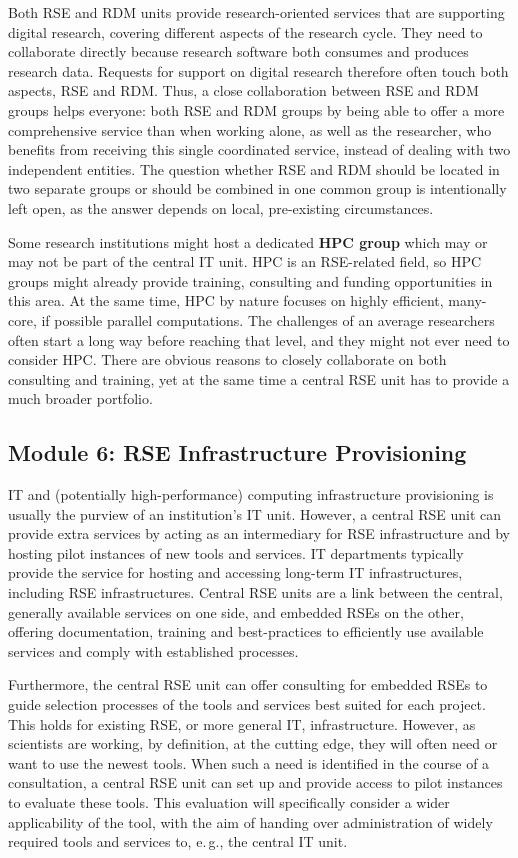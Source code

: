 \documentclass[a4paper]{article}
\makeatletter
\newcommand*{\eg}{e.\,g.\@\xspace}
\makeatother
\begin{document}
Both RSE and RDM units provide research-oriented services that are supporting digital research, covering different aspects of the research cycle.
They need to collaborate directly because research software both consumes and produces research data.
Requests for support on digital research therefore often touch both aspects, RSE and RDM\@.
Thus, a close collaboration between RSE and RDM groups helps everyone: both RSE and RDM groups by being able to offer a more comprehensive service than when working alone, as well as the researcher, who benefits from receiving this single coordinated service, instead of dealing with two independent entities.
The question whether RSE and RDM should be located in two separate groups or should be combined in one common group is intentionally left open, as the answer depends on local, pre-existing circumstances.

Some research institutions might host a dedicated \textbf{HPC group} which may or may not be part of the central IT unit.
HPC is an RSE-related field, so HPC groups might already provide training, consulting and funding opportunities in this area.
At the same time, HPC by nature focuses on highly efficient, many-core, if possible parallel computations.
The challenges of an average researchers often start a long way before reaching that level, and they might not ever need to consider HPC\@.
There are obvious reasons to closely collaborate on both consulting and training, yet at the same time a central RSE unit has to provide a much broader portfolio.

\subsection{Module 6: RSE Infrastructure Provisioning}%
\label{sec:infrastructure}

IT and (potentially high-performance) computing infrastructure provisioning is usually the purview of an institution's IT unit.
However, a central RSE unit can provide extra services by acting as an intermediary for RSE infrastructure and by hosting pilot instances of new tools and services.
IT departments typically provide the service for hosting and accessing long-term IT infrastructures, including RSE infrastructures.
Central RSE units are a link between the central, generally available services on one side,
and embedded RSEs on the other, offering documentation, training and best-practices to efficiently use available services and comply with established processes.

Furthermore, the central RSE unit can offer consulting for embedded RSEs to guide selection processes of the tools and services best suited for each project.
This holds for existing RSE, or more general IT, infrastructure.
However, as scientists are working, by definition, at the cutting edge, they will often need or want to use the newest tools.
When such a need is identified in the course of a consultation, a central RSE unit can set up and provide access to pilot instances to evaluate these tools.
This evaluation will specifically consider a wider applicability of the tool, with the aim of handing over administration of widely required tools and services to, \eg{}, the central IT unit.
\end{document}
